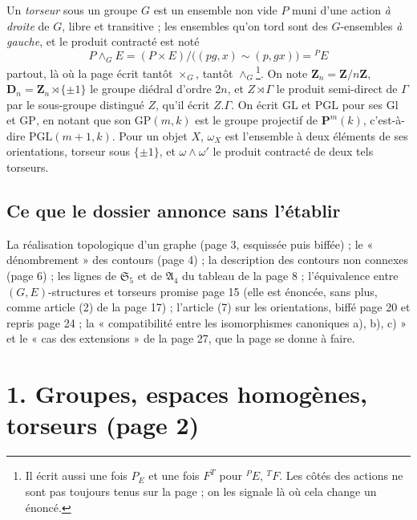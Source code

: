 \documentclass[11pt,a4paper]{article}
\begin{document}
Un \emph{torseur} sous un groupe $G$ est un ensemble non vide $P$ muni d'une
action \emph{à droite} de $G$, libre et transitive ; les ensembles qu'on tord
sont des $G$-ensembles \emph{à gauche}, et le produit contracté est noté
\[
  P \wedge_G E = (P \times E)/\bigl((pg, x) \sim (p, gx)\bigr) = {}^{P}E
\]
partout, là où la page écrit tantôt $\times_G$, tantôt $\wedge_G$\footnote{Il
écrit aussi une fois $P_E$ et une fois $F^{T}$ pour ${}^{P}E$, ${}^{T}F$. Les
côtés des actions ne sont pas toujours tenus sur la page ; on les signale là
où cela change un énoncé.}. On note $\mathbf{Z}_n = \mathbf{Z}/n\mathbf{Z}$,
$\mathbf{D}_n = \mathbf{Z}_n \rtimes \{\pm 1\}$ le groupe diédral d'ordre
$2n$, et $Z \rtimes \Gamma$ le produit semi-direct de $\Gamma$ par le
sous-groupe distingué $Z$, qu'il écrit $Z.\Gamma$. On écrit $\mathrm{GL}$ et
$\mathrm{PGL}$ pour ses $\mathrm{Gl}$ et $\mathrm{GP}$, en notant que son
$\mathrm{GP}(m, k)$ est le groupe projectif de $\mathbf{P}^{m}(k)$,
c'est-à-dire $\mathrm{PGL}(m+1, k)$. Pour un objet $X$, $\omega_X$ est
l'ensemble à deux éléments de ses orientations, torseur sous $\{\pm 1\}$, et
$\omega \wedge \omega'$ le produit contracté de deux tels torseurs.

\subsection*{Ce que le dossier annonce sans l'établir}

La réalisation topologique d'un graphe (page 3, esquissée puis biffée) ; le
« dénombrement » des contours (page 4) ; la description des contours non
connexes (page 6) ; les lignes de $\mathfrak{S}_5$ et de $\mathfrak{A}_4$ du
tableau de la page 8 ; l'équivalence entre $(G,E)$-structures et torseurs
promise page 15 (elle est énoncée, sans plus, comme article (2) de la page 17) ;
l'article (7) sur les orientations, biffé page 20 et repris page 24 ; la
« compatibilité entre les isomorphismes canoniques a), b), c) » et le « cas
des extensions » de la page 27, que la page se donne à faire.

\section*{1. Groupes, espaces homogènes, torseurs (page 2)}
\end{document}
